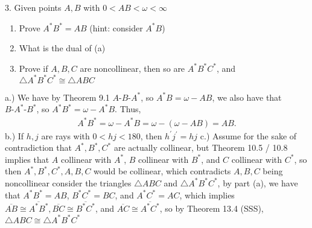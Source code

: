\documentclass{report}
\begin{document}
    \bigbreak \noindent 
    \begin{mdframed}
        3. Given points $A,B$ with $0 < AB < \omega < \infty$
        \begin{enumerate}[label=(\alph*)]
            \item Prove $A^{*}B^{*} = AB$ (hint: consider $A^{*}B$)
            \item What is the dual of (a)
            \item Prove if $A,B,C$ are noncollinear, then so are $A^{*}B^{*}C^{*}$, and $\triangle A^{*}B^{*}C^{*}  \cong \triangle ABC$
        \end{enumerate}
    \end{mdframed}
    \bigbreak \noindent 
    a.) We have by Theorem 9.1 $ A\text{-}B\text{-}A^{*}$, so $ A^{*}B = \omega - AB$, we also have that $ B\text{-}A^{*}\text{-}B^{*}$, so $ A^{*}B^{*} = \omega -A^{*}B$. Thus,
    \begin{align*}
        A^{*}B^{*} = \omega - A^{*}B = \omega - (\omega - AB) = AB
    .\end{align*}
    \bigbreak \noindent 
    b.) If $h,j$ are rays with $0 < hj < 180$, then $h^{\prime}j^{\prime} = hj $
    \bigbreak \noindent 
    c.) Assume for the sake of contradiction that $A^{*}, B^{*}, C^{*}$ are actually collinear, but Theorem 10.5 / 10.8 implies that $A$ collinear with $A^{*}$, $B$ collinear with $B^{*}$, and $C$ collinear with $C^{*}$, so then $A^{*}, B^{*}, C^{*}, A,B,C$ would be collinear, which contradicts $A,B,C$ being noncollinear
    \bigbreak \noindent 
    consider the triangles $\triangle ABC$ and $\triangle A^{*}B^{*}C^{*}$, by part (a), we have that $A^{*}B^{*} = AB$, $B^{*}C^{*} = BC$, and  $A^{*}C^{*} = AC$, which implies $ \overline{AB} \cong  \overline{A^{*}B^{*}}, \overline{BC} \cong \overline{B^{*}C^{*}}$, and $\overline{AC} \cong \overline{A^{*}C^{*}} $, so by Theorem 13.4 (SSS), $ \triangle ABC \cong \triangle A^{*}B^{*}C^{*}$
\end{document}

